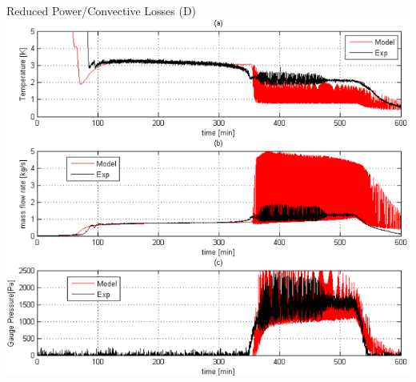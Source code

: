 \documentclass[10pt,t,xcolor=table]{UWMadBeamer}
\begin{document}
\begin{frame}{Reduced Power/Convective Losses  (D)}
    \centering
    \includegraphics[height=0.77\paperheight]{Comparison_HeaterBoxLoss2}
\end{frame}
\end{document}
